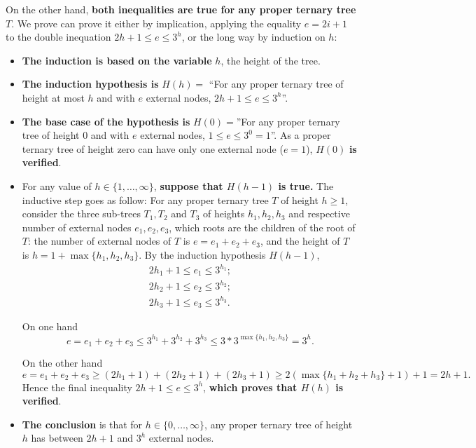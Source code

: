 \begin{enumerate}
\begin{solution}
\medskip

On the other hand, {\bf both inequalities are true for any proper
ternary tree} $T$.
%
We prove can prove it either by implication, applying the equality
$e=2i+1$ to the double inequation $2h+1\leq e \leq 3^h$, or the long
way by induction on $h$:

\begin{itemize}

\item {\bf The induction is based on the variable} $h$, the height of the tree.

\item {\bf The induction hypothesis is} $H(h)=$ ``For any proper
ternary tree of height at most $h$ and with $e$ external nodes,
%
$2h+1\leq e \leq 3^h$''.

\item {\bf The base case of the hypothesis is} $H(0)=$''For any proper
ternary tree of height $0$ and with $e$ external nodes,
$1\leq{e}\leq3^0=1$''.
%
As a proper ternary tree of height zero can have only one external
node ($e=1$), $H(0)$ {\bf is verified}.

\item For any value of $h\in\{1,\ldots,\infty\}$, {\bf suppose that
$H(h-1)$ is true.}  The inductive step goes as follow:
%
For any proper ternary tree $T$ of height $h\geq1$, consider the three
sub-trees $T_1,T_2$ and $T_3$ of heights $h_1,h_2,h_3$ and respective
number of external nodes $e_1,e_2,e_3$, which roots are the children
of the root of $T$: the number of external nodes of $T$ is
$e=e_1+e_2+e_3$, and the height of $T$ is $h=1+\max\{h_1,h_2,h_3\}$.
%
By the induction hypothesis $H(h-1)$, 
\begin{eqnarray*}
2h_1+1\leq e_1 \leq 3^{h_1};\\
2h_2+1\leq e_2 \leq 3^{h_2};\\
2h_3+1\leq e_3 \leq 3^{h_3}.
\end{eqnarray*}

On one hand 
$$e 
=     e_1+e_2+e_3 
\leq  3^{h_1}+3^{h_2}+3^{h_3} 
\leq  3*3^{\max\{h_1,h_2,h_3\}}
=     3^{h}.$$

On the other hand 
$$e 
=     e_1+e_2+e_3 
\geq (2h_1+1) + (2h_2+1) + (2h_3+1) 
\geq 2(\max\{h_1+h_2+h_3\}+1) +1
= 2h+1.$$
%
Hence the final inequality $2h+1\leq e \leq 3^{h}$, {\bf which proves
that $H(h)$ is verified}.

\item {\bf The conclusion} is that for $h\in\{0,\ldots,\infty\}$, any
proper ternary tree of height $h$ has between $2h+1$ and $3^h$ external nodes.



\end{itemize}
\end{solution}
\end{enumerate}

